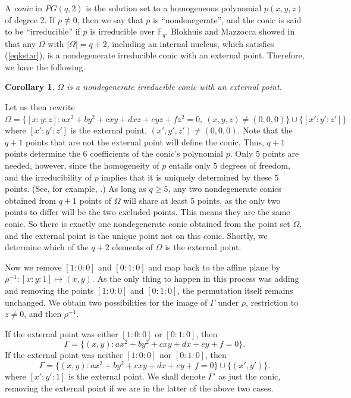 \documentclass[12pt]{article}
\newcommand{\F}{\mathbb{F}}
\newtheorem{corollary}{Corollary}[theorem]
\begin{document}
A {\em conic} in $PG(q,2)$ is the solution set to a homogeneous polynomial $p(x,y,z)$ of degree $2$.  If $p \not \equiv 0$, then we say that $p$ is ``nondenegerate'', and the conic is said to be ``irreducible'' if $p$ is irreducible over $\F_q$.  Blokhuis and Mazzocca showed in \cite{blokhuis} that any $\Omega$ with $|\Omega|=q+2$, including an internal nucleus, which satisfies (\ref{eqkstar}), is a nondegenerate irreducible conic with an external point.  Therefore, we have the following.

\begin{corollary}
$\Omega$ is a nondegenerate irreducible conic with an external point.    
\end{corollary}

Let us then rewrite $\Omega = \{[x:y:z] : ax^2 + by^2 + cxy + dxz +eyz + fz^2 = 0,\ (x,y,z)\neq(0,0,0)\} \cup \{ [x':y':z'] \}$ where $[x':y':z']$ is the external point, $(x',y',z') \neq (0,0,0)$. Note that the $q+1$ points that are not the external point will define the conic.  Thus, $q+1$ points determine the 6 coefficients of the conic's polynomial $p$.  Only $5$ points are needed, however, since the homogeneity of $p$ entails only $5$ degrees of freedom, and the irreducibility of $p$ implies that it is uniquely determined by these $5$ points.  (See, for example, \cite{coxeter}.)  As long as $q \geq 5$, any two nondegenerate conics obtained from $q+1$ points of $\Omega$ will share at least 5 points, as the only two points to differ will be the two excluded points. This means they are the same conic. So there is exactly one nondegenerate conic obtained from the point set $\Omega$, and the external point is the unique point not on this conic.  Shortly, we determine which of the $q+2$ elements of $\Omega$ is the external point.

Now we remove $[1:0:0]$ and $[0:1:0]$ and map back to the affine plane by $\rho^{-1}:[x:y:1] \mapsto (x,y)$. As the only thing to happen in this process was adding and removing the points $[1:0:0]$ and $[0:1:0]$, the permutation itself remains unchanged.  We obtain two possibilities for the image of $\Gamma$ under $\rho$, restriction to $z \neq 0$, and then $\rho^{-1}$.

If the external point was either $[1:0:0]$ or $[0:1:0]$, then
\[
\Gamma = \{(x,y): ax^2 + by^2 + cxy + dx +ey + f = 0\}.
\]
If the external point was neither $[1:0:0]$ nor $[0:1:0]$, then
\[
\Gamma = \{(x,y): ax^2 + by^2 + cxy + dx +ey + f = 0\} \cup \{(x',y')\}.
\]
where $[x':y':1]$ is the external point. We shall denote $\Gamma'$ as just the conic, removing the external point if we are in the latter of the above two cases.
\end{document}
